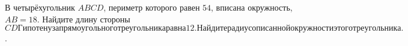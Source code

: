 \begin{ex}
	\begin{condition}
		В четырёхугольник \(ABCD\), периметр которого равен \( 54 \), вписана окружность, \(AB=18\). Найдите длину стороны \(CDГипотенуза прямоугольного треугольника равна 12. Найдите радиус описанной окружности этого треугольника.\).
	\end{condition}
\end{ex}